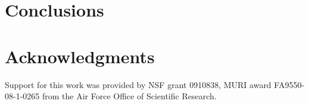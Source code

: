 \section{Conclusions}
\label{concl}

\section{Acknowledgments}
Support for this work was provided by NSF grant 0910838, MURI award FA9550-08-1-0265 from the Air Force Office of Scientific Research.


%
%

